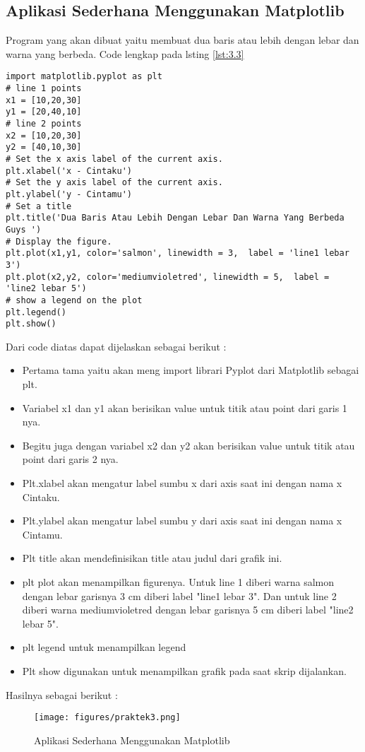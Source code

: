 \subsection{Aplikasi Sederhana Menggunakan Matplotlib}
Program yang akan dibuat yaitu membuat dua baris atau lebih dengan lebar dan warna yang berbeda. Code lengkap pada lsting \ref{lst:3.3}
\begin{lstlisting}[caption=Code Program Sederhana Matplotlib,label={lst:3.3}]
import matplotlib.pyplot as plt
# line 1 points
x1 = [10,20,30]
y1 = [20,40,10]
# line 2 points
x2 = [10,20,30]
y2 = [40,10,30]
# Set the x axis label of the current axis.
plt.xlabel('x - Cintaku')
# Set the y axis label of the current axis.
plt.ylabel('y - Cintamu')
# Set a title 
plt.title('Dua Baris Atau Lebih Dengan Lebar Dan Warna Yang Berbeda Guys ')
# Display the figure.
plt.plot(x1,y1, color='salmon', linewidth = 3,  label = 'line1 lebar 3')
plt.plot(x2,y2, color='mediumvioletred', linewidth = 5,  label = 'line2 lebar 5')
# show a legend on the plot
plt.legend()
plt.show()
\end{lstlisting}
Dari code diatas dapat dijelaskan sebagai berikut :
\begin{itemize}
\item
Pertama tama yaitu akan meng import librari Pyplot dari  Matplotlib sebagai plt.
\item
Variabel x1 dan y1 akan berisikan value untuk titik atau point dari garis 1 nya.
\item
Begitu juga dengan variabel x2 dan y2 akan berisikan value untuk titik atau point dari garis 2 nya.
\item
Plt.xlabel akan mengatur label sumbu x dari axis saat ini dengan nama x Cintaku.
\item
Plt.ylabel akan mengatur label sumbu y dari axis saat ini dengan nama x Cintamu.
\item
Plt title akan mendefinisikan title atau judul dari grafik ini.
\item
plt plot akan menampilkan figurenya. Untuk line 1 diberi warna salmon dengan lebar garisnya 3 cm diberi label "line1 lebar 3". Dan untuk  line 2 diberi warna mediumvioletred dengan lebar garisnya 5 cm diberi label "line2 lebar 5".
\item
plt legend untuk menampilkan legend 
\item
Plt show digunakan untuk menampilkan grafik pada saat skrip dijalankan.
\end{itemize}

Hasilnya sebagai berikut :
\begin{figure}[ht]
\centering
\texttt{[image: figures/praktek3.png]}
\caption{Aplikasi Sederhana Menggunakan Matplotlib}
\label{Praktek}
\end{figure}

